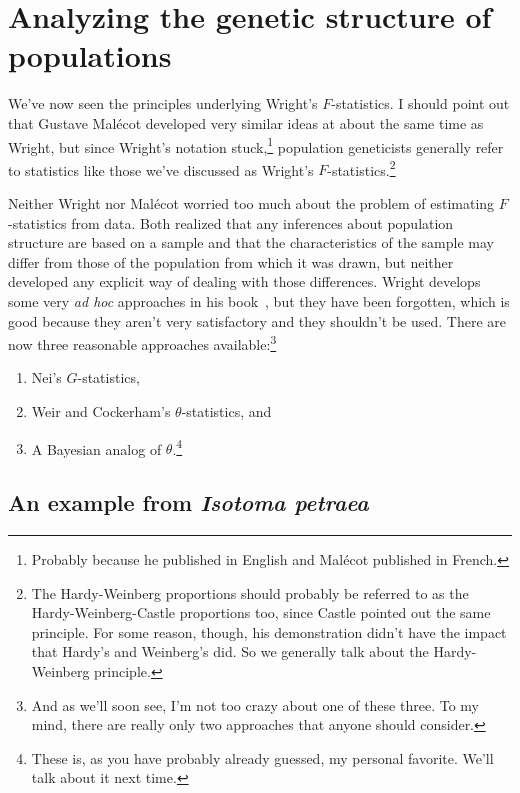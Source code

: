 \chapter{Analyzing the genetic structure of populations}

We've now seen the principles underlying Wright's $F$-statistics. I
should point out that Gustave Mal{\'e}cot developed very similar ideas
at about the same time as Wright, but since Wright's notation
stuck,\footnote{Probably because he published in English and
  Mal{\'e}cot published in French.} population geneticists generally
refer to statistics like those we've discussed as Wright's
$F$-statistics.\footnote{The Hardy-Weinberg proportions should
  probably be referred to as the Hardy-Weinberg-Castle proportions
  too, since Castle pointed out the same principle. For some reason,
  though, his demonstration didn't have the impact that Hardy's and
  Weinberg's did. So we generally talk about the Hardy-Weinberg
  principle.}

Neither Wright nor Mal{\'e}cot worried too much about the problem of
estimating $F$-statistics from data. Both realized that any inferences
about population structure are based on a sample and that the
characteristics of the sample may differ from those of the population
from which it was drawn, but neither developed any explicit way of
dealing with those differences. Wright develops some very {\it ad
  hoc\/} approaches in his book~\cite{Wright69}, but they have been
forgotten, which is good because they aren't very satisfactory and
they shouldn't be used. There are now three reasonable approaches
available:\footnote{And as we'll
  soon see, I'm not too crazy about one of these three. To my mind,
  there are really only two approaches that anyone should consider.}

\begin{enumerate}

\item Nei's $G$-statistics,

\item Weir and Cockerham's $\theta$-statistics, and

\item A Bayesian analog of $\theta$.\footnote{These is, as you have
  probably already guessed, my personal favorite. We'll talk about
  it next time.}

\end{enumerate}

\section*{An example from {\it Isotoma petraea}}

